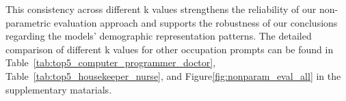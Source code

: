 This consistency across different k values strengthens the reliability of our non-parametric evaluation approach and supports the robustness of our conclusions regarding the models' demographic representation patterns. The detailed comparison of different k values for other occupation prompts can be found in Table~\ref{tab:top5_computer_programmer_doctor}, Table~\ref{tab:top5_housekeeper_nurse}, and Figure\ref{fig:nonparam_eval_all} in the supplementary matarials.

\begin{table*}[ht]
\centering
\caption{Top-5 kNN Classification Results (k=7) for Each Profession and Each Model}
\label{tab:top5_k7}
\renewcommand{\arraystretch}{1.2} %
\end{table*}
